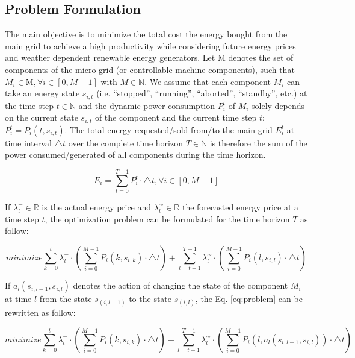 \subsection{Problem Formulation}
The main objective is to minimize the total cost the energy bought from the main grid to achieve a high productivity while considering future energy prices and weather dependent renewable energy generators. Let $\mathrm{M}$ denotes the set of components of the micro-grid (or controllable machine components), such that $M_i \in \mathrm{M}, \forall i \in [0, M-1]$  with $ M \in \mathbb{N}$. We assume that each component $M_i$ can take an energy state $s_{i,t}$ (i.e. “stopped”, “running”, “aborted”, “standby”, etc.) at the time step $t  \in \mathbb{N}$ and the dynamic power consumption $P_i^t$ of $M_i$ solely depends on the current state $s_{i,t}$ of the component and the current time step $t$: $P_i^t=P_i (t, s_{i,t})$. The total energy requested/sold from/to the main grid $E_i^t$ at time interval $\triangle t$ over the complete time horizon $T \in \mathbb{N}$ is therefore the sum of the power consumed/generated of all components during the time horizon.

%
\begin{equation}
E_i =\sum_{t=0}^{T-1}{ P_i^t \cdot \triangle t}, \forall i \in [0, M-1]
\end{equation}
%

 If $\lambda_t^- \in \mathbb{R}$ is the actual energy price and $\lambda_t^\sim \in \mathbb{R}$ the forecasted energy price at a time step $t$, the optimization problem can be formulated for the time horizon $T$ as follow:

%
\begin{equation}
\label{eq:problem}
minimize \sum_{k=0}^{t}{ {\lambda_t^-} \cdot ({ \sum_{i=0}^{M-1}{ P_i (k, s_{i,k}) \cdot \triangle t } })}+  \sum_{l=t+1}^{T-1}{\lambda_t^\sim \cdot ({ \sum_{i=0}^{M-1}{ P_i (l, s_{i,l}) \cdot \triangle t  } }) }
\end{equation}

If $a_l (s_{i,l-1},s_{i,l})$ denotes the action of changing the state of the component $M_i$ at time $l$ from the state $s_(i,l-1)$ to the state $s_(i,l)$, the Eq. \ref{eq:problem} can be rewritten as follow:

\begin{equation}
\label{eq:problem_reformulated}
minimize \sum_{k=0}^{t}{ {\lambda_t^-} \cdot ({ \sum_{i=0}^{M-1}{ P_i (k, s_{i,k}) \cdot \triangle t } })}+  \sum_{l=t+1}^{T-1}{\lambda_t^\sim \cdot ({ \sum_{i=0}^{M-1}{ P_i (l, a_l (s_{i,l-1},s_{i,l})) \cdot \triangle t  } }) }
\end{equation}

